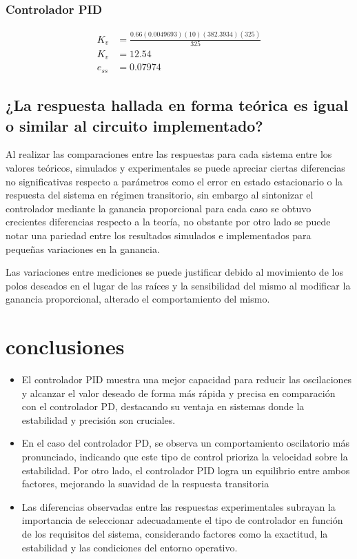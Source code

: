 \documentclass[conference]{IEEEtran}
\begin{document}
	\subsubsection{Controlador PID}
	\begin{align}
		K_v &= \frac{0.66(0.0049693)(10)(382.3934)(325)}{325} \\
		K_v &= 12.54 \\
		e_{ss} &= 0.07974
	\end{align}

	\subsection{\textbf{¿La respuesta hallada en forma teórica es igual o similar al circuito implementado?}}
	
	Al realizar las comparaciones entre las respuestas para cada sistema entre los valores teóricos, simulados y experimentales se puede apreciar ciertas diferencias no significativas respecto a parámetros como el error en estado estacionario o la respuesta del sistema en régimen transitorio, sin embargo al sintonizar el controlador mediante la ganancia proporcional para cada caso se obtuvo crecientes diferencias respecto a la teoría, no obstante por otro lado se puede notar una pariedad entre los resultados simulados e implementados para pequeñas variaciones en la ganancia.
	
	Las variaciones entre mediciones se puede justificar debido al movimiento de los polos deseados en el lugar de las raíces y la sensibilidad del mismo al modificar la ganancia proporcional, alterado el comportamiento del mismo.
	
	\section{conclusiones}
	\begin{itemize}
		\item El controlador PID muestra una mejor capacidad para reducir las oscilaciones y alcanzar el valor deseado de forma más rápida y precisa en comparación con el controlador PD, destacando su ventaja en sistemas donde la estabilidad y precisión son cruciales.
		\item En el caso del controlador PD, se observa un comportamiento oscilatorio más pronunciado, indicando que este tipo de control prioriza la velocidad sobre la estabilidad. Por otro lado, el controlador PID logra un equilibrio entre ambos factores, mejorando la suavidad de la respuesta transitoria
		\item  Las diferencias observadas entre las respuestas experimentales subrayan la importancia de seleccionar adecuadamente el tipo de controlador en función de los requisitos del sistema, considerando factores como la exactitud, la estabilidad y las condiciones del entorno operativo.
	\end{itemize}
	
	
	
\end{document}
